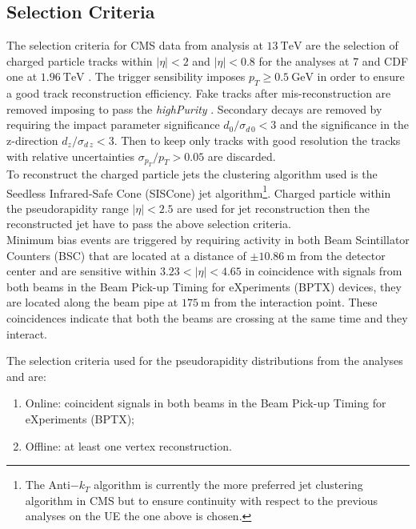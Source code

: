 
\subsection{Selection Criteria}

The selection criteria for CMS data from analysis at $13\ \mathrm{TeV}$ \cite{CMS-PAS-FSQ-15-007} are the selection of charged particle tracks within $|\eta| < 2$ and  $|\eta|<0.8$ for the analyses at $7$ \cite{CMS-PAS-FSQ-12-020} and CDF one at $1.96\ \mathrm{TeV}$ \cite{CDF:2015txs}. The trigger sensibility imposes $p_T \geq 0.5\ \mathrm{GeV}$ in order to ensure a good track reconstruction efficiency. Fake tracks after mis-reconstruction are removed imposing to pass the \textit{highPurity} \cite{HighPurity}. Secondary decays are removed by requiring the impact parameter significance $d_0/\sigma_{d\,0} < 3$ and the significance in the z-direction $d_z/\sigma_{d\,z} < 3$. Then to keep only tracks with good resolution the tracks with relative uncertainties $\sigma_{p_T}/p_T > 0.05$ are discarded.
\\
To reconstruct the charged particle jets the clustering algorithm used is the Seedless Infrared-Safe Cone (SISCone) \cite{JetAlgorithm1} jet algorithm\footnote{The Anti$-k_T$ algorithm \cite{JetAlgorithm2} is currently the more preferred jet clustering algorithm in CMS but to ensure continuity with respect to the previous analyses on the UE the one above is chosen.}. Charged particle within the pseudorapidity range $|\eta|<2.5$ are used for jet reconstruction then the reconstructed jet have to pass the above selection criteria.
\\
Minimum bias events are triggered by requiring activity in both Beam Scintillator Counters (BSC) that are located at a distance of $\pm10.86\ \mathrm{m}$ from the detector center and are sensitive within $3.23 < |\eta| < 4.65$ in coincidence with signals from both beams in the Beam Pick-up Timing for eXperiments (BPTX) devices, they are located along the beam pipe at $175\ \mathrm{m}$ from the interaction point. These coincidences indicate that both the beams are crossing at the same time and they interact.

The selection criteria used for the pseudorapidity distributions from the analyses \cite{CMS:2018nhd} and \cite{CMS:2015zrm} are: 
\begin{enumerate}
	\item Online: coincident signals in both beams in the Beam Pick-up Timing for eXperiments (BPTX);
	\item Offline: at least one vertex reconstruction.
\end{enumerate}

